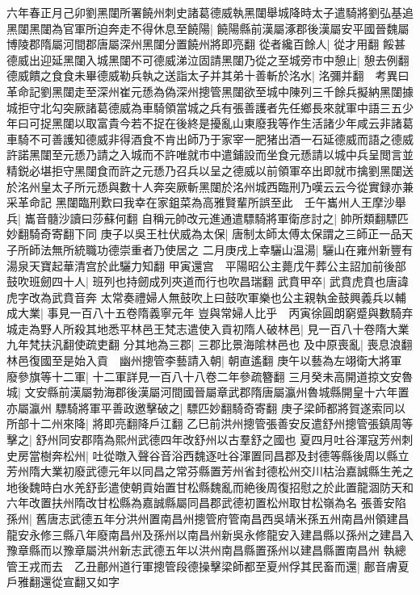 六年春正月己卯劉黑闥所署饒州刺史諸葛德威執黑闥舉城降時太子遣騎將劉弘基追黑闥黑闥為官軍所迫奔走不得休息至饒陽|{
	饒陽縣前漢屬涿郡後漢屬安平國晉魏屬博陵郡隋屬河間郡唐屬深州黑闥分置饒州將即亮翻}
從者纔百餘人|{
	從才用翻}
餒甚德威出迎延黑闥入城黑闥不可德威涕泣固請黑闥乃從之至城旁市中憩止|{
	憩去例翻}
德威饋之食食未畢德威勒兵執之送詣太子并其弟十善斬於洺水|{
	洺彌并翻　考異曰革命記劉黑闥走至深州崔元愻為偽深州摠管黑闥欲至城中陳列三千餘兵擬納黑闥據城拒守北勾突厥諸葛德威為車騎領當城之兵有張善護者先任鄉長來就軍中語三五少年曰可捉黑闥以取富貴今若不捉在後終是擾亂山東廢我等作生活諸少年咸云非諸葛車騎不可善護知德威非得酒食不肯出師乃于家宰一肥猪出酒一石延德威而語之德威許諾黑闥至元愻乃請之入城而不許唯就市中遣鋪設而坐食元愻請以城中兵呈閲言並精鋭必堪拒守黑闥食而許之元愻乃召兵以呈之德威以前領軍卒出即就市擒劉黑闥送於洺州皇太子所元愻與數十人奔突厥斬黑闥於洺州城西臨刑乃嘆云云今從實録亦兼采革命記}
黑闥臨刑歎曰我幸在家鉏菜為高雅賢輩所誤至此　壬午巂州人王摩沙舉兵|{
	巂音髓沙讀曰莎蘇何翻}
自稱元帥改元進通遣驃騎將軍衛彦討之|{
	帥所類翻驃匹妙翻騎奇寄翻下同}
庚子以吳王杜伏威為太保|{
	唐制太師太傅太保謂之三師正一品天子所師法無所統職功德崇重者乃使居之}
二月庚戌上幸驪山温湯|{
	驪山在雍州新豐有湯泉天寶起華清宫於此驪力知翻}
甲寅還宫　平陽昭公主薨戊午葬公主詔加前後部鼓吹班劒四十人|{
	班列也持劒成列夾道而行也吹昌瑞翻}
武賁甲卒|{
	武賁虎賁也唐諱虎字改為武賁音奔}
太常奏禮婦人無鼓吹上曰鼓吹軍樂也公主親執金鼓興義兵以輔成大業|{
	事見一百八十五卷隋義寧元年}
豈與常婦人比乎　丙寅徐圓朗窮蹙與數騎弃城走為野人所殺其地悉平林邑王梵志遣使入貢初隋人破林邑|{
	見一百八十卷隋大業九年梵扶汎翻使疏吏翻}
分其地為三郡|{
	三郡比景海隂林邑也}
及中原喪亂|{
	喪息浪翻}
林邑復國至是始入貢　幽州摠管李藝請入朝|{
	朝直遙翻}
庚午以藝為左翊衛大將軍　廢參旗等十二軍|{
	十二軍詳見一百八十八卷二年參疏簪翻}
三月癸未高開道掠文安魯城|{
	文安縣前漢屬勃海郡後漢屬河間國晉屬章武郡隋唐屬瀛州魯城縣開皇十六年置亦屬瀛州}
驃騎將軍平善政邀擊破之|{
	驃匹妙翻騎奇寄翻}
庚子梁師都將賀遂索同以所部十二州來降|{
	將即亮翻降戶江翻}
乙巳前洪州摠管張善安反遣舒州摠管張鎮周等擊之|{
	舒州同安郡隋為熙州武德四年改舒州以古羣舒之國也}
夏四月吐谷渾寇芳州刺史房當樹奔松州|{
	吐從暾入聲谷音浴西魏逐吐谷渾置同昌郡及封德等縣後周以縣立芳州隋大業初廢武德元年以同昌之常芬縣置芳州省封德松州交川枯治嘉誠縣生羌之地後魏時白水羌舒彭遣使朝貢始置甘松縣魏亂而絶後周復招慰之於此置龍涸防天和六年改置扶州隋改甘松縣為嘉誠縣屬同昌郡武德初置松州取甘松嶺為名}
張善安陷孫州|{
	舊唐志武德五年分洪州置南昌州摠管府管南昌西吳靖米孫五州南昌州領建昌龍安永修三縣八年廢南昌州及孫州以南昌州新吳永修龍安入建昌縣以孫州之建昌入豫章縣而以豫章屬洪州新志武德五年以洪州南昌縣置孫州以建昌縣置南昌州}
執總管王戎而去　乙丑鄜州道行軍摠管段德操擊梁師都至夏州俘其民畜而還|{
	鄜音膚夏戶雅翻還從宣翻又如字}
